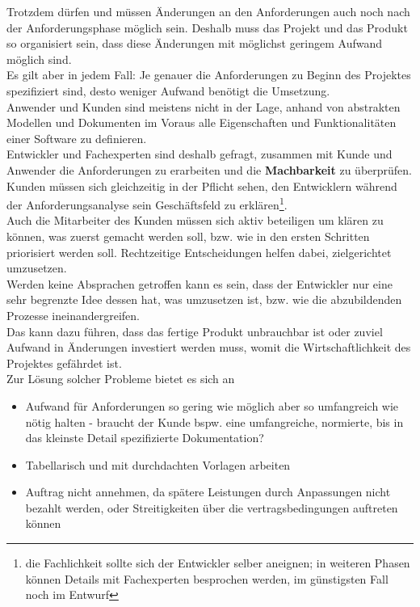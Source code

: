 \noindent
Trotzdem dürfen und müssen Änderungen an den Anforderungen auch noch nach der Anforderungsphase möglich sein.
Deshalb muss das Projekt und das Produkt so organisiert sein, dass diese Änderungen mit möglichst geringem Aufwand möglich sind.\\
Es gilt aber in jedem Fall: Je genauer die Anforderungen zu Beginn des Projektes spezifiziert sind, desto weniger Aufwand benötigt die Umsetzung.\\

\noindent
Anwender und Kunden sind meistens nicht in der Lage, anhand von abstrakten Modellen und Dokumenten im Voraus alle Eigenschaften und Funktionalitäten einer Software zu definieren.\\
Entwickler und Fachexperten sind deshalb gefragt, zusammen mit Kunde und Anwender die Anforderungen zu erarbeiten und die \textbf{Machbarkeit} zu überprüfen.\\

\noindent
Kunden müssen sich gleichzeitig in der Pflicht sehen, den Entwicklern während der Anforderungsanalyse sein Geschäftsfeld zu erklären\footnote{
die Fachlichkeit sollte sich der Entwickler selber aneignen; in weiteren Phasen können Details mit Fachexperten besprochen werden, im günstigsten Fall noch im Entwurf
}.\\
Auch die Mitarbeiter des Kunden müssen sich aktiv beteiligen um klären zu können, was zuerst gemacht werden soll, bzw. wie in den ersten Schritten priorisiert werden soll.
Rechtzeitige Entscheidungen helfen dabei, zielgerichtet umzusetzen.\\

\noindent
Werden keine Absprachen getroffen kann es sein, dass der Entwickler nur eine sehr begrenzte Idee dessen hat, was umzusetzen ist, bzw. wie die abzubildenden Prozesse ineinandergreifen.\\
Das kann dazu führen, dass das fertige Produkt unbrauchbar ist oder zuviel Aufwand in Änderungen investiert werden muss, womit die Wirtschaftlichkeit des Projektes gefährdet ist.\\

\noindent
Zur Lösung solcher Probleme bietet es sich an

\begin{itemize}
    \item Aufwand für Anforderungen so gering wie möglich aber so umfangreich wie nötig halten - braucht der Kunde bspw. eine umfangreiche, normierte, bis in das kleinste Detail spezifizierte Dokumentation?
    \item Tabellarisch und mit durchdachten Vorlagen arbeiten
    \item Auftrag nicht annehmen, da spätere Leistungen durch Anpassungen nicht bezahlt werden, oder Streitigkeiten über die vertragsbedingungen auftreten können
\end{itemize}


